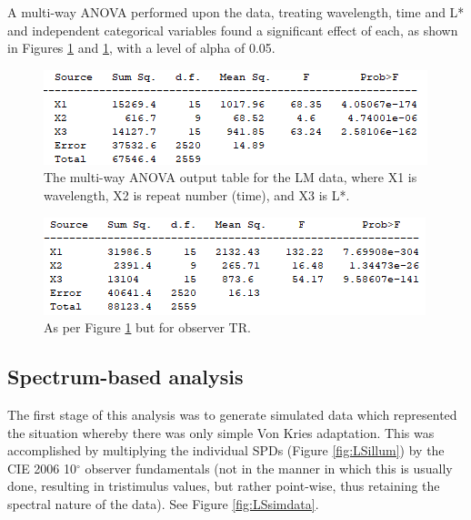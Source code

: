 A multi-way ANOVA performed upon the data, treating wavelength, time and L* and independent categorical variables found a significant effect of each, as shown in Figures \ref{fig:anova} and \ref{fig:anova}, with a level of alpha of 0.05.

\begin{figure}[htbp]
\includegraphics[max width=\textwidth]{figs/LargeSphere/anova.png}
\caption{The multi-way ANOVA output table for the LM data, where X1 is wavelength, X2 is repeat number (time), and X3 is L*.}
\label{fig:anova}
\end{figure}

\begin{figure}[htbp]
\includegraphics[max width=\textwidth]{figs/LargeSphere/anova2.png}
\caption{As per Figure \ref{fig:anova} but for observer TR.}
\label{fig:anova2}
\end{figure}

\clearpage



\subsection{Spectrum-based analysis}


The first stage of this analysis was to generate simulated data which represented the situation whereby there was only simple Von Kries adaptation. This was accomplished by multiplying the individual \glspl{SPD} (Figure \ref{fig:LSillum}) by the CIE 2006 10$^{\circ}$ observer fundamentals (not in the manner in which this is usually done, resulting in tristimulus values, but rather point-wise, thus retaining the spectral nature of the data). See Figure \ref{fig:LSsimdata}.

